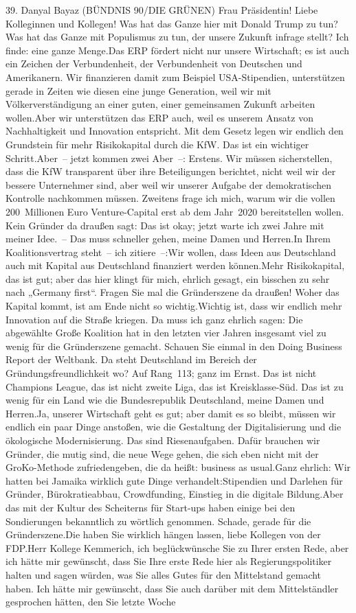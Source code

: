 \documentclass{article}
\begin{document}
	39. Danyal Bayaz (BÜNDNIS 90/DIE GRÜNEN) Frau Präsidentin! Liebe Kolleginnen und Kollegen! Was hat das Ganze hier mit Donald Trump zu tun? Was hat das Ganze mit Populismus zu tun, der unsere Zukunft infrage stellt? Ich finde: eine ganze Menge.Das ERP fördert nicht nur unsere Wirtschaft; es ist auch ein Zeichen der Verbundenheit, der Verbundenheit von Deutschen und Amerikanern. Wir finanzieren damit zum Beispiel USA-Stipendien, unterstützen gerade in Zeiten wie diesen eine junge Generation, weil wir mit Völkerverständigung an einer guten, einer gemeinsamen Zukunft arbeiten wollen.Aber wir unterstützen das ERP auch, weil es unserem Ansatz von Nachhaltigkeit und Innovation entspricht. Mit dem Gesetz legen wir endlich den Grundstein für mehr Risikokapital durch die KfW. Das ist ein wichtiger Schritt.Aber – jetzt kommen zwei Aber –: Erstens. Wir müssen sicherstellen, dass die KfW transparent über ihre Beteiligungen berichtet, nicht weil wir der bessere Unternehmer sind, aber weil wir unserer Aufgabe der demokratischen Kontrolle nachkommen müssen. Zweitens frage ich mich, warum wir die vollen 200 Millionen Euro Venture-Capital erst ab dem Jahr 2020 bereitstellen wollen. Kein Gründer da draußen sagt: Das ist okay; jetzt warte ich zwei Jahre mit meiner Idee. – Das muss schneller gehen, meine Damen und Herren.In Ihrem Koalitionsvertrag steht – ich zitiere –:Wir wollen, dass Ideen aus Deutschland auch mit Kapital aus Deutschland finanziert werden können.Mehr Risikokapital, das ist gut; aber das hier klingt für mich, ehrlich gesagt, ein bisschen zu sehr nach „­Germany first“. Fragen Sie mal die Gründerszene da draußen! Woher das Kapital kommt, ist am Ende nicht so wichtig.Wichtig ist, dass wir endlich mehr Innovation auf die Straße kriegen. Da muss ich ganz ehrlich sagen: Die abgewählte Große Koalition hat in den letzten vier Jahren insgesamt viel zu wenig für die Gründerszene gemacht. Schauen Sie einmal in den Doing Business Report der Weltbank. Da steht Deutschland im Bereich der Gründungsfreundlichkeit wo? Auf Rang 113; ganz im Ernst. Das ist nicht Champions League, das ist nicht zweite Liga, das ist Kreisklasse-Süd. Das ist zu wenig für ein Land wie die Bundesrepublik Deutschland, meine Damen und Herren.Ja, unserer Wirtschaft geht es gut; aber damit es so bleibt, müssen wir endlich ein paar Dinge anstoßen, wie die Gestaltung der Digitalisierung und die ökologische Modernisierung. Das sind Riesenaufgaben. Dafür brauchen wir Gründer, die mutig sind, die neue Wege gehen, die sich eben nicht mit der GroKo-Methode zufriedengeben, die da heißt: business as usual.Ganz ehrlich: Wir hatten bei Jamaika wirklich gute Dinge verhandelt:Stipendien und Darlehen für Gründer, Bürokratieabbau, Crowdfunding, Einstieg in die digitale Bildung.Aber das mit der Kultur des Scheiterns für Start-ups haben einige bei den Sondierungen bekanntlich zu wörtlich genommen. Schade, gerade für die Gründerszene.Die haben Sie wirklich hängen lassen, liebe Kollegen von der FDP.Herr Kollege Kemmerich, ich beglückwünsche Sie zu Ihrer ersten Rede, aber ich hätte mir gewünscht, dass Sie Ihre erste Rede hier als Regierungspolitiker halten und sagen würden, was Sie alles Gutes für den Mittelstand gemacht haben. Ich hätte mir gewünscht, dass Sie auch darüber mit dem Mittelständler gesprochen hätten, den Sie letzte Woche 
\end{document}

